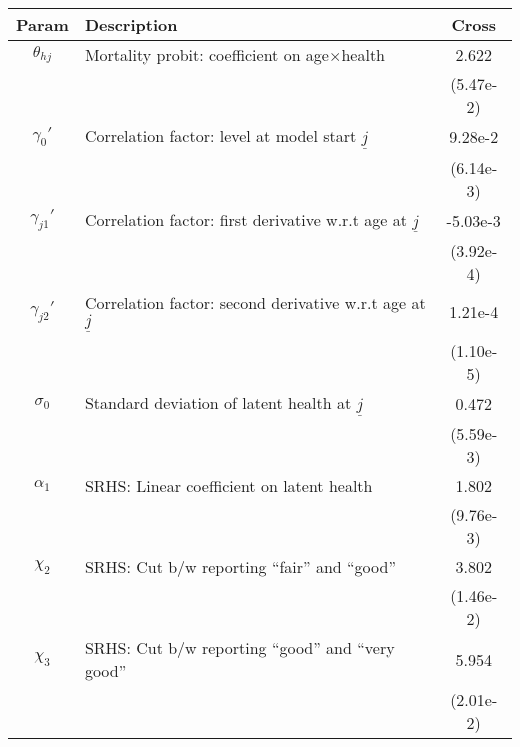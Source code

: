 \begin{table}[ht]\label{CrossWomenOtherParams}
\footnotesize
\begin{center}
\begin{tabular}{clc}
\hline \hline
Param & Description & Cross \\
\hline
$\theta_{hj}$ & Mortality probit: coefficient on age$\times$health & 2.622 \\
 & & (5.47e-2) \\
$\gamma_{0}'$ & Correlation factor: level at model start $\underline{j}$ & 9.28e-2 \\
 & & (6.14e-3) \\
$\gamma_{j1}'$ & Correlation factor: first derivative w.r.t age at $\underline{j}$ & -5.03e-3 \\
 & & (3.92e-4) \\
$\gamma_{j2}'$ & Correlation factor: second derivative w.r.t age at $\underline{j}$ & 1.21e-4 \\
 & & (1.10e-5) \\
$\sigma_{0}$ & Standard deviation of latent health at $\underline{j}$ & 0.472 \\
 & & (5.59e-3) \\
$\alpha_1$ & SRHS: Linear coefficient on latent health & 1.802 \\
 & & (9.76e-3) \\
$\chi_2$ & SRHS: Cut b/w reporting ``fair'' and ``good'' & 3.802 \\
 & & (1.46e-2) \\
$\chi_3$ & SRHS: Cut b/w reporting ``good'' and ``very good'' & 5.954 \\
 & & (2.01e-2) \\
\hline\hline
\end{tabular}
\end{center}
\end{table}

